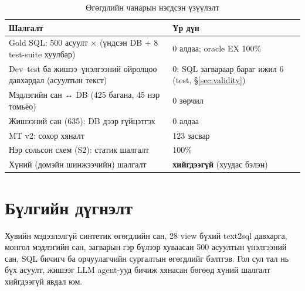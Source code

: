 \begin{table}[H]
\centering\small
\caption{Өгөгдлийн чанарын нэгдсэн үзүүлэлт}
\label{tab:quality}
\begin{tabularx}{\textwidth}{X p{5.0cm}}
\toprule
Шалгалт & Үр дүн \\
\midrule
Gold SQL: 500 асуулт × (үндсэн DB + 8 test-suite хуулбар) & 0 алдаа; oracle EX 100\% \\
Dev--test ба жишээ--үнэлгээний ойролцоо давхардал (асуултын текст) & 0; SQL загвараар бараг ижил 6 (test,
§\ref{sec:validity}) \\
Мэдлэгийн сан ↔ DB (425 багана, 45 нэр томьёо) & 0 зөрчил \\
Жишээний сан (635): DB дээр гүйцэтгэх & 0 алдаа \\
MT v2: сохор хяналт & 123 засвар \\
Нэр сольсон схем (S2): статик шалгалт & 100\% \\
Хүний (домэйн шинжээчийн) шалгалт & \textbf{хийгдээгүй} (хуудас бэлэн) \\
\bottomrule
\end{tabularx}
\end{table}

\section{Бүлгийн дүгнэлт}
\label{sec:ch4-summary}

Хувийн мэдээлэлгүй синтетик өгөгдлийн сан, 28 view бүхий text2sql давхарга, монгол мэдлэгийн сан, загварын гэр бүлээр
хуваасан 500 асуултын үнэлгээний сан, SQL бичигч ба орчуулагчийн сургалтын өгөгдлийг бэлтгэв. Гол сул тал нь бүх асуулт,
жишээг LLM agent-ууд бичиж хянасан бөгөөд хүний шалгалт хийгдээгүй явдал юм.
